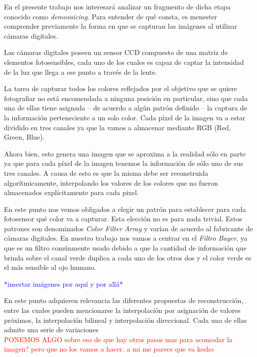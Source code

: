 \documentclass[a4paper]{article}
\begin{document}
En el presente trabajo nos interesará analizar un fragmento de dicha etapa conocido como \emph{demosaicing}. Para entender de qué consta, es menester comprender previamente la forma en que se capturan las imágenes al utilizar cámaras digitales.

Las cámaras digitales poseen un sensor CCD compuesto de una matriz de elementos fotosensibles, cada uno de los cuales es capaz de captar la intensidad de la luz que llega a ese punto a través de la lente. 

La tarea de capturar todos los colores reflejados por el objetivo que se quiere fotografiar no está encomendada a ninguna posición en particular, sino que cada una de ellas tiene asignada – de acuerdo a algún patrón definido  – la captura de la información perteneciente a un solo color. Cada p\'ixel de la imagen va a estar dividido en tres canales ya que la vamos a almacenar mediante RGB (Red, Green, Blue).

Ahora bien, esto genera una imagen que se aproxima a la realidad sólo en parte ya que para cada p\'ixel de la imagen tenemos la informaci\'on de s\'olo uno de sus tres canales. A causa de esto es que la misma debe ser reconstruida algorítmicamente, interpolando los valores de los colores que no fueron almacenados explícitamente para cada pixel.

En este punto nos vemos obligados a elegir un patr\'on para establecer para cada fotosensor qu\'e color va a capturar. Esta elecci\'on no es para nada trivial. Estos patrones son denominados \emph{Color Filter Array} y var\'ian de acuerdo al fabricante de c\'amaras digitales. En nuestro trabajo nos vamos a centrar en el\emph{ Filtro Bayer}, ya que es un filtro com\'unmente usado debido a que la cantidad de informaci\'on que brinda sobre el canal verde duplica a cada uno de los otros dos y el color verde es el m\'as sensible al ojo humano. 

\textcolor{blue}{*insertar imágenes por aquí y por allá*}

En este punto adquieren relevancia las diferentes propuestas de reconstrucción, entre las cuales pueden mencionarse la interpolación por asignación de valores próximos, la interpolación bilineal y interpolación direccional. Cada una de ellas admite una serie de variaciones \\

\textcolor{red}{PONEMOS ALGO sobre eso de que hay otros pasos mas para acomodar la imagen? pero que no los vamos  a hacer. a mi me parece que va kcsho}
\end{document}
